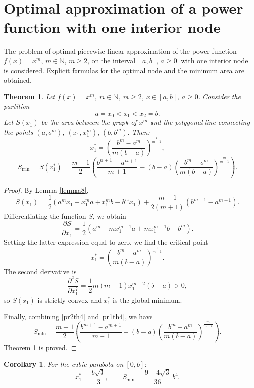 \documentclass[amstex,16pt, amssymb]{article}
\theoremstyle{plain}
\newtheorem{theorem}{Theorem}[section]
\newtheorem{corollary}{Corollary}[section]
\theoremstyle{definition}
\numberwithin{equation}{section}
\numberwithin{equation}{section}
\begin{document}
\section{Optimal approximation of a power function with one interior node}


The problem of optimal piecewise linear approximation of the power func\-tion \(f(x)=x^m\), \(m\in\mathbb{N}\), \(m\geq 2\), on the interval \([a,b]\), \(a\geq 0\), with one interior node is considered. Explicit formulas for the optimal node and the minimum area are obtained.

\begin{theorem}\label{theorem4}
Let \(f(x)=x^m\), \(m\in\mathbb{N}\), \(m\geq 2\), \(x\in[a,b]\), \(a\geq 0\). Consider the partition
\[
a=x_0<x_1<x_2=b.
\]
Let \(S(x_1)\) be the area between the graph of \(x^m\) and the polygonal line connecting the points \((a,a^m)\), \((x_1,x_1^m)\), \((b,b^m)\). Then:
\[
x_1^*=\left(\frac{b^m-a^m}{m(b-a)}\right)^{\frac{1}{m-1}},
\]
\[
S_{\min}=S(x_1^*)=\frac{m-1}{2}\left(\frac{b^{m+1}-a^{m+1}}{m+1}-(b-a)\left(\frac{b^m-a^m}{m(b-a)}\right)^{\frac{m}{m-1}}\right).
\]
\end{theorem}

\begin{proof}
By Lemma \ref{lemma8},
\begin{equation}\label{pr1th4}
S(x_1)=\frac12\left(a^m x_1 - x_1^m a + x_1^m b - b^m x_1\right)+\frac{m-1}{2(m+1)}(b^{m+1}-a^{m+1}). 
\end{equation}
Differentiating the function $S$, we obtain
\[
\frac{\partial S}{\partial x_1}=\frac12\left(a^m - m x_1^{m-1}a + m x_1^{m-1}b - b^m\right).
\]
Setting the latter expression equal to zero, we find the critical point
\begin{equation}\label{pr2th4}
x_1^*=\left(\frac{b^m-a^m}{m(b-a)}\right)^{\frac{1}{m-1}}. 
\end{equation}
The second derivative is
\[
\frac{\partial^2S}{\partial x_1^2}=\frac12 m(m-1)x_1^{m-2}(b-a)>0,
\]
so \(S(x_1)\) is strictly convex and \(x_1^*\) is the global minimum.

Finally, combining \eqref{pr2th4} and \eqref{pr1th4}, we have
\[
S_{\min}=\frac{m-1}{2}\left(\frac{b^{m+1}-a^{m+1}}{m+1}-(b-a)\left(\frac{b^m-a^m}{m(b-a)}\right)^{\frac{m}{m-1}}\right). 
\]
Theorem \ref{theorem4} is proved. 
\end{proof}

\begin{corollary}
For the cubic parabola on \([0,b]:\)
\[
x_1^*=\frac{b\sqrt{3}}{3},\qquad S_{\min}=\frac{9-4\sqrt{3}}{36}\,b^4.
\]
\end{corollary}
\end{document}
